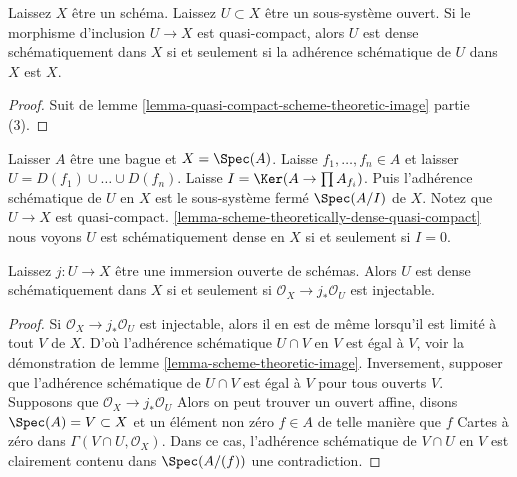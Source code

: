 \begin{lemma}

\label{lemma-scheme-theoretically-dense-quasi-compact}
Laissez $X$ être un schéma. Laissez $U \subset X$ être un sous-système ouvert. Si le morphisme d'inclusion $U \to X$ est quasi-compact, alors $U$ est dense schématiquement dans $X$ si et seulement si la adhérence schématique de $U$ dans $X$ est $X$.
\end{lemma}

\begin{proof}
Suit de lemme \ref{lemma-quasi-compact-scheme-theoretic-image} partie (3).
\end{proof}

\begin{example}

\label{example-scheme-theoretic-closure}

Laisser $A$ être une bague et $X = \Spec(A)$. Laisse $f_1, \ldots, f_n \in A$ et laisser $U = D(f_1) \cup \ldots \cup D(f_n)$. Laisse $I = \Ker(A \to \prod A_{f_i})$. Puis l'adhérence schématique de $U$ en $X$
est le sous-système fermé $\Spec(A/I)$ de $X$. Notez que $U \to X$ est quasi-compact. \ref{lemma-scheme-theoretically-dense-quasi-compact}
nous voyons $U$ est schématiquement dense en $X$ si et seulement si $I = 0$.

\end{example}

\begin{lemma}

\label{lemma-characterize-scheme-theoretically-dense}
Laissez $j : U \to X$ être une immersion ouverte de schémas. Alors $U$ est dense schématiquement dans $X$ si et seulement si $\mathcal{O}_X \to j_*\mathcal{O}_U$ est injectable.
\end{lemma}

\begin{proof}

Si $\mathcal{O}_X \to j_*\mathcal{O}_U$ est injectable, alors il en est de même lorsqu'il est limité à tout $V$ de $X$. D'où l'adhérence schématique $U \cap V$ en $V$
est égal à $V$, voir la démonstration de lemme \ref{lemma-scheme-theoretic-image}. Inversement, supposer que l'adhérence schématique de $U \cap V$ est égal à $V$ pour tous ouverts $V$. Supposons que $\mathcal{O}_X \to j_*\mathcal{O}_U$ Alors on peut trouver un ouvert affine, disons $\Spec(A) = V \subset X$
et un élément non zéro $f \in A$ de telle manière que $f$ Cartes à zéro dans
$\Gamma(V \cap U, \mathcal{O}_X)$. Dans ce cas, l'adhérence schématique de $V \cap U$ en $V$ est clairement contenu dans $\Spec(A/(f))$
une contradiction.

\end{proof}

